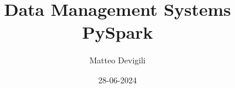\documentclass[xcolor=dvipsnames]{beamer}
\title{Data Management Systems \\ PySpark}
\author{Matteo Devigili}
\institute[A]{Bayes Business School}
\date{28-06-2024}
\begin{document}
\begin{frame}[c]
    \titlepage %
\end{frame}

\end{document}
